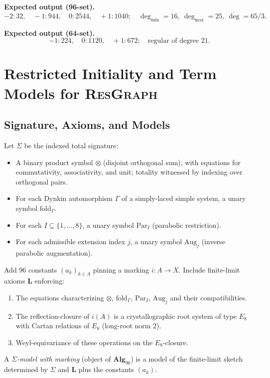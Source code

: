 \documentclass[12pt]{article}
\begin{document}
\noindent\textbf{Expected output (96-set).}
\[
-2:32,\quad -1:944,\quad 0:2544,\quad +1:1040;\quad
\deg_{\min}=16,\ \deg_{\max}=25,\ \overline{\deg}=65/3.
\]

\noindent\textbf{Expected output (64-set).}
\[
-1:224,\quad 0:1120,\quad +1:672;\quad
\text{regular of degree }21.
\]


\section{Restricted Initiality and Term Models for \textsc{ResGraph}}

\subsection{Signature, Axioms, and Models}
Let $\Sigma$ be the indexed total signature:
\begin{itemize}\itemsep2pt
  \item A binary product symbol $\otimes$ (disjoint orthogonal sum), with equations for commutativity, associativity, and unit; totality witnessed by indexing over orthogonal pairs.
  \item For each Dynkin automorphism $\Gamma$ of a simply-laced simple system, a unary symbol $\mathrm{fold}_{\Gamma}$.
  \item For each $I\subseteq\{1,\dots,8\}$, a unary symbol $\mathrm{Par}_I$ (parabolic restriction).
  \item For each admissible extension index $j$, a unary symbol $\mathrm{Aug}_j$ (inverse parabolic augmentation).
\end{itemize}
Add $96$ constants $(a_k)_{k\in A}$ pinning a marking $i:A\to X$. Include finite-limit axioms $\mathbf L$ enforcing:
\begin{enumerate}\itemsep2pt
  \item The equations characterizing $\otimes$, $\mathrm{fold}_{\Gamma}$, $\mathrm{Par}_I$, $\mathrm{Aug}_j$ and their compatibilities.
  \item The reflection-closure of $i(A)$ is a crystallographic root system of type $E_8$ with Cartan relations of $E_8$ (long-root norm $2$).
  \item Weyl-equivariance of these operations on the $E_8$-closure.
\end{enumerate}
A \emph{$\Sigma$-model with marking} (object of $\mathbf{Alg}_{96}$) is a model of the finite-limit sketch determined by $\Sigma$ and $\mathbf L$ plus the constants $(a_k)$.
\end{document}
